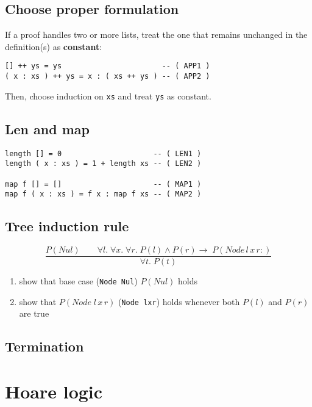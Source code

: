 \documentclass[10pt,a4paper,landscape]{article}
\begin{document}
\begin{multicols*}{3}
\subsection*{Choose proper formulation}
If a proof handles two or more lists, treat the one that remains unchanged in the definition(s) as \textbf{constant}:
\begin{lstlisting}
[] ++ ys = ys                       -- ( APP1 )
( x : xs ) ++ ys = x : ( xs ++ ys ) -- ( APP2 )
\end{lstlisting}
Then, choose induction on \texttt{xs} and treat \texttt{ys} as constant.
\subsection*{Len and map}
\begin{lstlisting}
length [] = 0                     -- ( LEN1 )
length ( x : xs ) = 1 + length xs -- ( LEN2 )

map f [] = []                     -- ( MAP1 )
map f ( x : xs ) = f x : map f xs -- ( MAP2 )
\end{lstlisting}

\subsection*{Tree induction rule}
\begin{displaymath}
\frac{P(Nul)\qquad \forall l.\; \forall x.\; \forall r.\; P(l) \land P(r) \rightarrow\; P(Node\,l\,x\,r:)}{\forall t.\; P(t)}
\end{displaymath}
\begin{enumerate}
\item show that base case (\verb|Node Nul|) $P(Nul)$ holds
\item show that $P(Node\;l\,x\,r)$ (\verb|Node lxr|) holds whenever both $P(l)$ and $P(r)$ are true
\end{enumerate}
\subsection*{Termination}

\section{Hoare logic}


\end{multicols*}
\end{document}
